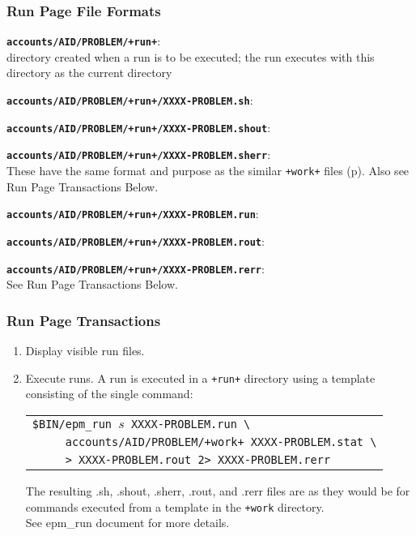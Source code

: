 \documentclass[12pt]{article}
\newenvironment{indpar}[1][0.4in]%
	{\begin{list}{}%
		     {\setlength{\itemsep}{0in}%
		      \setlength{\topsep}{0in}%
		      \setlength{\parsep}{1ex}%
		      \setlength{\labelwidth}{#1}%
		      \setlength{\leftmargin}{#1}%
		      \addtolength{\leftmargin}{\labelsep}}%
	 \item}%
	{\end{list}}
\newenvironment{itemlist}[1][0.2in]%
	{\begin{list}{}{\setlength{\labelwidth}{#1}%
		        \setlength{\leftmargin}{\labelwidth}%
		        \addtolength{\leftmargin}{+0.2in}%
		        \addtolength{\linewidth}{-\labelwidth}%
		        \addtolength{\linewidth}{-0.2in}%
		        \renewcommand{\makelabel}[1]{##1\hfill}}
	 \raggedright}%
	{\end{list}}
\newcommand{\TT}[1]{{\tt \bfseries #1}}
\newcommand{\pagref}[1]{p\pageref{#1}}
\newcommand{\BSL}{\textbackslash}
\begin{document}
\subsubsection{Run Page File Formats}

\begin{indpar}
\begin{itemlist}
\item[\TT{accounts/AID/PROBLEM/+run+}:]~
\label{PROBLEM/RUN} \\
    directory created when a run is to be executed;
    the run executes with this directory as the current
    directory
\item[\TT{accounts/AID/PROBLEM/+run+/XXXX-PROBLEM.sh}:]
\item[\TT{accounts/AID/PROBLEM/+run+/XXXX-PROBLEM.shout}:]\vspace*{-1ex}
\item[\TT{accounts/AID/PROBLEM/+run+/XXXX-PROBLEM.sherr}:]\vspace*{-1ex} ~ \\
These have the same format and purpose as the similar {\tt +work+}
files (\pagref{PROBLEM/WORK}).  Also see Run Page Transactions Below.

\item[\TT{accounts/AID/PROBLEM/+run+/XXXX-PROBLEM.run}:]
\item[\TT{accounts/AID/PROBLEM/+run+/XXXX-PROBLEM.rout}:]\vspace*{-1ex}
\item[\TT{accounts/AID/PROBLEM/+run+/XXXX-PROBLEM.rerr}:]\vspace*{-1ex} ~ \\
See Run Page Transactions Below.

\end{itemlist}
\end{indpar}

\subsubsection{Run Page Transactions}

\begin{enumerate}
\item Display visible run files.
\item Execute runs.  A run is executed in a {\tt +run+}
      directory using a template consisting of the single
      command:
      \begin{center}
      \begin{tabular}{l}
      \tt \$BIN/epm\_run $s$ XXXX-PROBLEM.run \BSL \\
      \tt ~~~~ accounts/AID/PROBLEM/+work+ XXXX-PROBLEM.stat \BSL \\
      \tt ~~~~ > XXXX-PROBLEM.rout 2> XXXX-PROBLEM.rerr
      \end{tabular}
      \end{center}
      The resulting .sh, .shout, .sherr, .rout, and .rerr
      files are as they would be for commands executed from
      a template in the {\tt +work} directory.
      \\[1ex]
      See epm\_run document for more details.

\end{enumerate}
\end{document}
